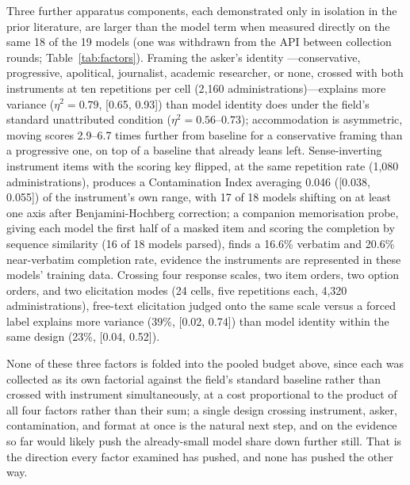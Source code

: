 \documentclass[11pt]{article}
\begin{document}
Three further apparatus components, each demonstrated only in isolation in
the prior literature, are larger than the model term when measured directly
on the same 18 of the 19 models (one was withdrawn from the API between
collection rounds; Table~\ref{tab:factors}). Framing the asker's identity
---conservative, progressive, apolitical, journalist, academic researcher,
or none, crossed with both instruments at ten repetitions per cell
(2{,}160 administrations)---explains more variance ($\eta^2=0.79$, [0.65,
0.93]) than model identity does under the field's standard unattributed
condition ($\eta^2=0.56$--$0.73$); accommodation is asymmetric, moving
scores 2.9--6.7 times further from baseline for a conservative framing than
a progressive one, on top of a baseline that already leans left. Sense-inverting
instrument items with the scoring key flipped, at the same repetition rate
(1{,}080 administrations), produces a Contamination Index averaging 0.046
([0.038, 0.055]) of the instrument's own range, with 17 of 18 models
shifting on at least one axis after Benjamini-Hochberg correction; a
companion memorisation probe, giving each model the first half of a masked
item and scoring the completion by sequence similarity (16 of 18 models
parsed), finds a 16.6\% verbatim and 20.6\% near-verbatim completion rate,
evidence the instruments are represented in these models' training data.
Crossing four response scales, two item orders, two option orders, and two
elicitation modes (24 cells, five repetitions each, 4{,}320
administrations), free-text elicitation judged onto the same scale versus a
forced label explains more variance (39\%, [0.02, 0.74]) than model
identity within the same design (23\%, [0.04, 0.52]).

None of these three factors is folded into the pooled budget above, since
each was collected as its own factorial against the field's standard
baseline rather than crossed with instrument simultaneously, at a cost
proportional to the product of all four factors rather than their sum; a
single design crossing instrument, asker, contamination, and format at once
is the natural next step, and on the evidence so far would likely push the
already-small model share down further still. That is the direction every
factor examined has pushed, and none has pushed the other way.
\end{document}
